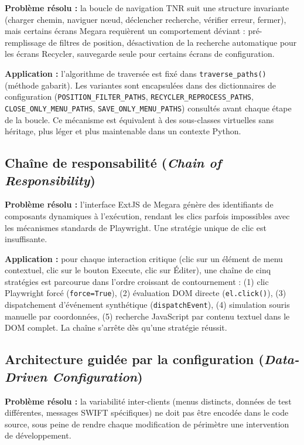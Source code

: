 \documentclass[12pt, a4paper]{report}
\begin{document}
\textbf{Problème résolu :} la boucle de navigation TNR suit une structure invariante (charger chemin, naviguer nœud, déclencher recherche, vérifier erreur, fermer), mais certains écrans Megara requièrent un comportement déviant : pré-remplissage de filtres de position, désactivation de la recherche automatique pour les écrans Recycler, sauvegarde seule pour certains écrans de configuration.

\textbf{Application :} l'algorithme de traversée est fixé dans \texttt{traverse\_paths()} (méthode gabarit). Les variantes sont encapsulées dans des dictionnaires de configuration (\texttt{POSITION\_FILTER\_PATHS}, \texttt{RECYCLER\_REPROCESS\_PATHS}, \texttt{CLOSE\_ONLY\_MENU\_PATHS}, \texttt{SAVE\_ONLY\_MENU\_PATHS}) consultés avant chaque étape de la boucle. Ce mécanisme est équivalent à des sous-classes virtuelles sans héritage, plus léger et plus maintenable dans un contexte Python.

\subsection{Chaîne de responsabilité (\textit{Chain of Responsibility})}

\textbf{Problème résolu :} l'interface ExtJS de Megara génère des identifiants de composants dynamiques à l'exécution, rendant les clics parfois impossibles avec les mécanismes standards de Playwright. Une stratégie unique de clic est insuffisante.

\textbf{Application :} pour chaque interaction critique (clic sur un élément de menu contextuel, clic sur le bouton Execute, clic sur Éditer), une chaîne de cinq stratégies est parcourue dans l'ordre croissant de contournement : (1) clic Playwright forcé (\texttt{force=True}), (2) évaluation DOM directe (\texttt{el.click()}), (3) dispatchement d'événement synthétique (\texttt{dispatchEvent}), (4) simulation souris manuelle par coordonnées, (5) recherche JavaScript par contenu textuel dans le DOM complet. La chaîne s'arrête dès qu'une stratégie réussit.

\subsection{Architecture guidée par la configuration (\textit{Data-Driven Configuration})}

\textbf{Problème résolu :} la variabilité inter-clients (menus distincts, données de test différentes, messages SWIFT spécifiques) ne doit pas être encodée dans le code source, sous peine de rendre chaque modification de périmètre une intervention de développement.
\end{document}
